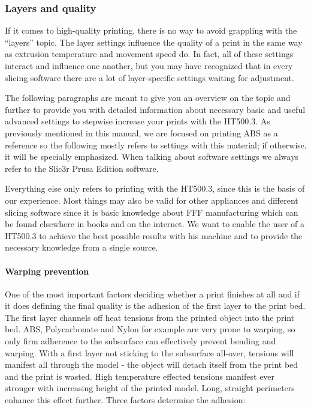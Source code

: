 \subsubsection{Layers and quality}

If it comes to high-quality printing, there is no way to avoid grappling with the “layers” topic. The layer settings influence the quality of a print in the same way as extrusion temperature and movement speed do. In fact, all of these settings interact and influence one another, but you may have recognized that in every slicing software there are a lot of layer-specific settings waiting for adjustment.

The following paragraphs are meant to give you an overview on the topic and further to provide you with detailed information about necessary basic and useful advanced settings to stepwise increase your prints with the HT500.3.
As previously mentioned in this manual, we are focused on printing ABS as a reference so the following mostly refers to settings with this material; if otherwise, it will be specially emphasized.
When talking about software settings we always refer to the Slic3r Prusa Edition software.

Everything else only refers to printing with the HT500.3, since this is the basis of our experience. Most things may also be valid for other appliances and different slicing software since it is basic knowledge about FFF manufacturing which can be found elsewhere in books and on the internet. We want to enable the user of a HT500.3 to achieve the best possible results with his machine and to provide the necessary knowledge from a single source. 

\paragraph{Warping prevention}

One of the most important factors deciding whether a print finishes at all and if it does defining the final quality is the adhesion of the first layer to the print bed. The first layer channels off heat tensions from the printed object into the print bed.
ABS, Polycarbonate and Nylon for example are very prone to warping, so only firm adherence to the subsurface can effectively prevent bending and warping. With a first layer not sticking to the subsurface all-over, tensions will manifest all through the model - the object will detach itself from the print bed and the print is wasted. High temperature effected tensions manifest ever stronger with increasing height of the printed model. Long, straight perimeters enhance this effect further.
Three factors determine the adhesion: 

